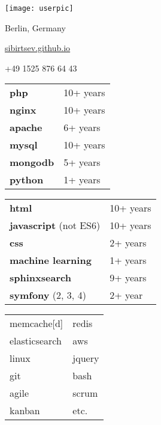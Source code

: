 \documentclass[paper=a4,fontsize=11pt]{eucv}
\begin{document}
\begin{minipage}{.2\linewidth}
   \texttt{[image: userpic]}
\end{minipage}      
\begin{minipage}{0.7\linewidth}
   \sepspace
   \noindent
   
   \hfill Berlin, Germany

   \hfill {}%
   
   \hfill \href{https://sibirtsev.github.io/}{sibirtsev.github.io}%
   
   \hfill +49 1525 876 64 43%
   
   \hfill {}%
\end{minipage}


\hspace{3mm}
\begin{minipage}[t]{0.33\textwidth} 
	
	\begin{tabular}[t]{ l l }
		\textbf{php} & 10+ years \\
		\textbf{nginx} & 10+ years \\
		\textbf{apache} & 6+ years \\
		\textbf{mysql} & 10+ years \\
		\textbf{mongodb} & 5+ years \\
		\textbf{python} & 1+ years \\
	\end{tabular}
	
	\sepspace
	
\end{minipage}
%
\begin{minipage}[t]{0.33\textwidth} 
	
	\begin{tabular}[t]{ l l }
		\textbf{html} & 10+ years \\
		\textbf{javascript} (not ES6) & 10+ years \\
		\textbf{css} & 2+ years \\
		\textbf{machine learning} & 1+ years \\
		\textbf{sphinxsearch} & 9+ years \\
		\textbf{symfony} (2, 3, 4) & 2+ year
	\end{tabular}
	
	\sepspace
	
\end{minipage}
%
\begin{minipage}[t]{0.33\textwidth} 
	\begin{tabular}[t]{l l}
		memcache[d] & redis \\
		elasticsearch & aws \\
		linux & jquery  \\
		git & bash \\
		agile & scrum  \\
		kanban & etc. \\
	\end{tabular}
\end{minipage}
\end{document}
